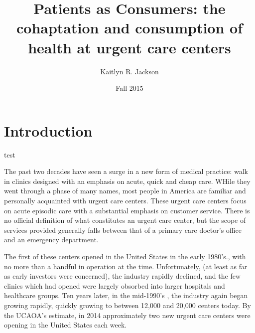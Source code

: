 \documentclass[12pt,twoside]{reedthesis}
\title{Patients as Consumers: the cohaptation and consumption of health at
urgent care centers}
\author{Kaitlyn R. Jackson}
\date{Fall 2015}
\begin{document}
      \maketitle
  
  \frontmatter %
  \pagestyle{empty} %

  
  

      \hypersetup{linkcolor=black}
    \setcounter{tocdepth}{2}
    \tableofcontents
  
  
  
  
  
  \mainmatter %
  \pagestyle{fancyplain} %

  \chapter*{Introduction}\label{introduction}
  
  \onehalfspacing
  
  test
  
  The past two decades have seen a surge in a new form of medical
  practice: walk in clinics designed with an emphasis on acute, quick and
  cheap care. WHile they went through a phase of many names, most people
  in America are familiar and personally acquainted with urgent care
  centers. These urgent care centers focus on acute episodic care with a
  substantial emphasis on customer service. There is no official
  definition of what constitutes an urgent care center, but the scope of
  services provided generally falls between that of a primary care
  doctor's office and an emergency department.
  
  The first of these centers opened in the United States in the early
  1980's., with no more than a handful in operation at the time.
  Unfortunately, (at least as far as early investors were concerned), the
  industry rapidly declined, and the few clinics which had opened were
  largely obsorbed into larger hospitals and healthcare groups. Ten years
  later, in the mid-1990's , the industry again began growing rapidly,
  quickly growing to between 12,000 and 20,000 centers today. By the
  UCAOA's estimate, in 2014 approximately two new urgent care centers were
  opening in the United States each week.
  
\end{document}
